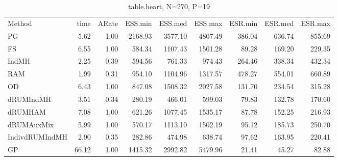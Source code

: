 \begin{table}
\label{tab:blogit-heart}
\begin{tabular}{l r r r r r r r r } 
          Method  &     time &    ARate &  ESS.min &  ESS.med &  ESS.max &  ESR.min &  ESR.med &  ESR.max \\ 
              PG  &     5.62 &     1.00 &  2168.93 &  3577.10 &  4807.49 &   386.04 &   636.74 &   855.69 \\ 
              FS  &     6.55 &     1.00 &   584.34 &  1107.43 &  1501.28 &    89.28 &   169.20 &   229.35 \\ 
           IndMH  &     2.25 &     0.39 &   594.56 &   761.33 &   974.43 &   264.46 &   338.34 &   432.34 \\ 
             RAM  &     1.99 &     0.31 &   954.10 &  1104.96 &  1317.57 &   478.27 &   554.01 &   660.89 \\ 
              OD  &     6.43 &     1.00 &   847.08 &  1508.32 &  2027.58 &   131.70 &   234.54 &   315.28 \\ 
       dRUMIndMH  &     3.51 &     0.34 &   280.19 &   466.01 &   599.03 &    79.83 &   132.78 &   170.60 \\ 
         dRUMHAM  &     7.08 &     1.00 &   621.26 &  1077.45 &  1535.17 &    87.78 &   152.25 &   216.93 \\ 
      dRUMAuxMix  &     5.99 &     1.00 &   570.17 &  1113.10 &  1502.19 &    95.12 &   185.73 &   250.70 \\ 
  IndivdRUMIndMH  &     2.90 &     0.35 &   282.86 &   474.98 &   638.74 &    97.62 &   163.95 &   220.41 \\ 
              GP  &    66.12 &     1.00 &  1415.32 &  2992.82 &  5479.96 &    21.41 &    45.27 &    82.88
 \end{tabular}
\caption{table.heart, N=270, P=19}
\end{table}

